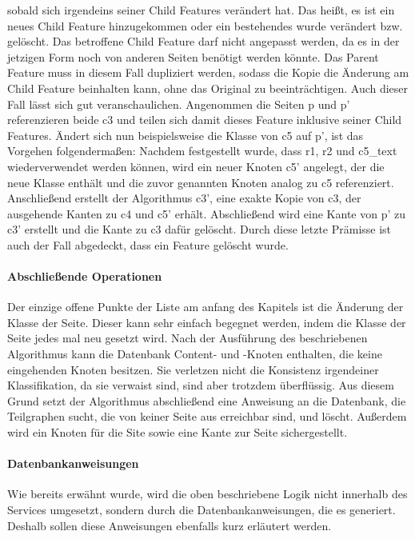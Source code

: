 \begin{enumerate}
        sobald sich irgendeins seiner Child Features verändert hat.
        Das heißt, es ist ein neues Child Feature hinzugekommen oder
        ein bestehendes wurde verändert bzw. gelöscht.
        Das betroffene Child Feature darf nicht angepasst werden,
        da es in der jetzigen Form noch von anderen Seiten benötigt werden könnte.
        Das Parent Feature muss in diesem Fall dupliziert werden,
        sodass die Kopie die Änderung am Child Feature beinhalten kann,
        ohne das Original zu beeinträchtigen.
        Auch dieser Fall lässt sich gut veranschaulichen.
        Angenommen die Seiten p und p' referenzieren beide c3 und teilen sich damit
        dieses Feature inklusive seiner Child Features.
        Ändert sich nun beispielsweise die Klasse von c5 auf p',
        ist das Vorgehen folgendermaßen:
        Nachdem festgestellt wurde, dass r1, r2 und c5\_text wiederverwendet werden können,
        wird ein neuer Knoten c5' angelegt, der die neue Klasse enthält
        und die zuvor genannten Knoten analog zu c5 referenziert.
        Anschließend erstellt der Algorithmus c3', eine exakte Kopie von c3,
        der ausgehende Kanten zu c4 und c5' erhält.
        Abschließend wird eine Kante von p' zu c3' erstellt und die Kante zu c3 dafür gelöscht.
        Durch diese letzte Prämisse ist auch der Fall abgedeckt,
        dass ein Feature gelöscht wurde.
    \end{enumerate}

    \paragraph{Abschließende Operationen}
    Der einzige offene Punkte der Liste am anfang des Kapitels ist die Änderung der Klasse der Seite.
    Dieser kann sehr einfach begegnet werden, indem die Klasse der Seite jedes mal neu gesetzt wird.
    Nach der Ausführung des beschriebenen Algorithmus kann die Datenbank
    Content- und {\resource}-Knoten enthalten, die keine eingehenden Knoten besitzen.
    Sie verletzen nicht die Konsistenz irgendeiner Klassifikation, da sie verwaist sind,
    sind aber trotzdem überflüssig.
    Aus diesem Grund setzt der Algorithmus abschließend eine Anweisung an die Datenbank,
    die Teilgraphen sucht, die von keiner Seite aus erreichbar sind, und löscht.
    Außerdem wird ein Knoten für die Site sowie eine Kante zur Seite sichergestellt.

    \paragraph{Datenbankanweisungen}
    Wie bereits erwähnt wurde, wird die oben beschriebene Logik nicht innerhalb
    des Services umgesetzt, sondern durch die Datenbankanweisungen, die es generiert.
    Deshalb sollen diese Anweisungen ebenfalls kurz erläutert werden.
    
